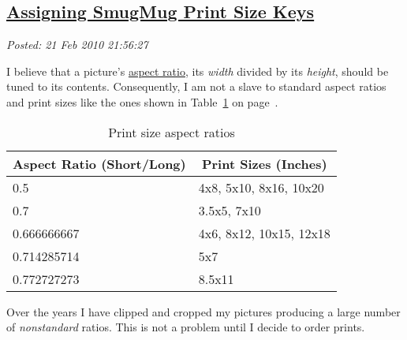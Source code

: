 %

\subsection*{\href{https://bakerjd99.wordpress.com/2010/02/21/assigning-smugmug-print-size-keys/}{Assigning SmugMug Print Size Keys}}


\noindent\emph{Posted: 21 Feb 2010 21:56:27}
\vspace{6pt}

I believe that a picture's
\href{http://en.wikipedia.org/wiki/Aspect\_ratio\_(image)}{aspect
ratio}, its \emph{width} divided by its \emph{height}, should be tuned
to its contents. Consequently, I am not a slave to standard aspect
ratios and print sizes like the ones shown in Table~\ref{tab:442x0} on page~\pageref{tab:442x0}.

%
%
%
%
%
%
%
%
%
%
%

\begin{table}[ht]
\centering
{}
\begin{tabular}{|l|p{}|} \hline
  \multicolumn{1}{|c|}{\textbf{Aspect Ratio (Short/Long)}}  &
  \multicolumn{1}{|c|}{\textbf{Print Sizes (Inches)}} \\ \hline  
   0.5              & 4x8, 5x10, 8x16, 10x20   \\ \hline
   0.7              & 3.5x5, 7x10              \\ \hline
   0.666666667      & 4x6, 8x12, 10x15, 12x18  \\ \hline
   0.714285714      & 5x7                      \\ \hline
   0.772727273      & 8.5x11                   \\ \hline
\end{tabular}
\caption{Print size aspect ratios}
\label{tab:442x0}
\end{table}


Over the years I have clipped and cropped my pictures producing a large
number of \emph{nonstandard} ratios. This is not a problem until I
decide to order prints.

